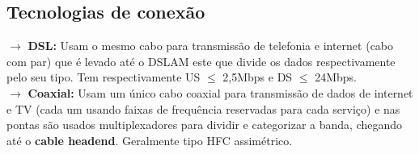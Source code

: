 \documentclass[12pt]{article}
\begin{document}
    \subsection{Tecnologias de conexão}
    $\rightarrow$ \textbf{DSL:} Usam o mesmo cabo para transmissão de telefonia e internet (cabo com par) que é levado até o DSLAM este que divide os dados respectivamente pelo seu tipo. Tem respectivamente US $\leq$ 2,5Mbps e DS $\leq$ 24Mbps.
    \\$\rightarrow$ \textbf{Coaxial:} Usam um único cabo coaxial para transmissão de dados de internet e TV (cada um usando faixas de frequência reservadas para cada serviço) e nas pontas são usados multiplexadores para dividir e categorizar a banda, chegando até o \textbf{cable headend}. Geralmente tipo HFC assimétrico.


\end{document}
